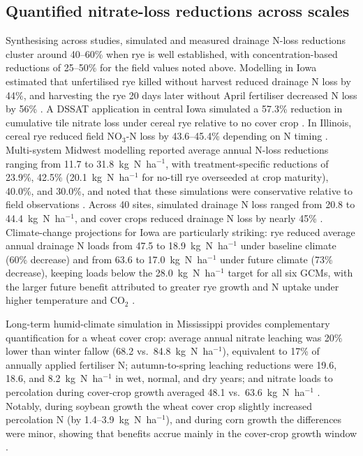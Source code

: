 \subsection{Quantified nitrate-loss reductions across scales}
Synthesising across studies, simulated and measured drainage N-loss reductions cluster around 40--60\% when rye is well established, with concentration-based reductions of 25--50\% for the field values noted above. Modelling in Iowa estimated that unfertilised rye killed without harvest reduced drainage N loss by 44\%, and harvesting the rye 20 days later without April fertiliser decreased N loss by 56\% \parencite{Malone2018}. A DSSAT application in central Iowa simulated a 57.3\% reduction in cumulative tile nitrate loss under cereal rye relative to no cover crop \parencite{Chatterjee2025}. In Illinois, cereal rye reduced field NO$_3$-N loss by 43.6--45.4\% depending on N timing \parencite{Gupta2022}. Multi-system Midwest modelling reported average annual N-loss reductions ranging from 11.7 to 31.8~kg~N~ha$^{-1}$, with treatment-specific reductions of 23.9\%, 42.5\% (20.1~kg~N~ha$^{-1}$ for no-till rye overseeded at crop maturity), 40.0\%, and 30.0\%, and noted that these simulations were conservative relative to field observations \parencite{Malone2014b}. Across 40 sites, simulated drainage N loss ranged from 20.8 to 44.4~kg~N~ha$^{-1}$, and cover crops reduced drainage N loss by nearly 45\% \parencite{Malone2023}. Climate-change projections for Iowa are particularly striking: rye reduced average annual drainage N loads from 47.5 to 18.9~kg~N~ha$^{-1}$ under baseline climate (60\% decrease) and from 63.6 to 17.0~kg~N~ha$^{-1}$ under future climate (73\% decrease), keeping loads below the 28.0~kg~N~ha$^{-1}$ target for all six GCMs, with the larger future benefit attributed to greater rye growth and N uptake under higher temperature and CO$_2$ \parencite{Malone2020}.

Long-term humid-climate simulation in Mississippi provides complementary quantification for a wheat cover crop: average annual nitrate leaching was 20\% lower than winter fallow (68.2 vs.\ 84.8~kg~N~ha$^{-1}$), equivalent to 17\% of annually applied fertiliser N; autumn-to-spring leaching reductions were 19.6, 18.6, and 8.2~kg~N~ha$^{-1}$ in wet, normal, and dry years; and nitrate loads to percolation during cover-crop growth averaged 48.1 vs.\ 63.6~kg~N~ha$^{-1}$ \parencite{Yang2021}. Notably, during soybean growth the wheat cover crop slightly increased percolation N (by 1.4--3.9~kg~N~ha$^{-1}$), and during corn growth the differences were minor, showing that benefits accrue mainly in the cover-crop growth window \parencite{Yang2021}.


